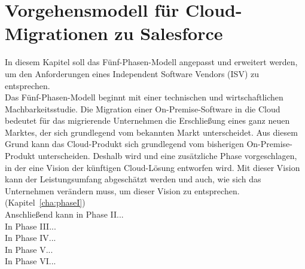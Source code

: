 \section{Vorgehensmodell für Cloud-Migrationen zu Salesforce}
\label{cha:entwickelung_vorgehensmodell}
In diesem Kapitel soll das Fünf-Phasen-Modell angepasst und erweitert werden, um den Anforderungen eines Independent Software Vendors (ISV) zu entsprechen. \\

Das Fünf-Phasen-Modell beginnt mit einer technischen und wirtschaftlichen Machbarkeitsstudie. Die Migration einer On-Premise-Software in die Cloud bedeutet für das migrierende Unternehmen die Erschließung eines ganz neuen Marktes, der sich grundlegend vom bekannten Markt unterscheidet. Aus diesem Grund kann das Cloud-Produkt sich grundlegend vom bisherigen On-Premise-Produkt unterscheiden. Deshalb wird  und  eine zusätzliche Phase vorgeschlagen, in der eine Vision der künftigen Cloud-Lösung entworfen wird. Mit dieser Vision kann der Leistungsumfang abgeschätzt werden und auch, wie sich das Unternehmen verändern muss, um dieser Vision zu entsprechen. (Kapitel~\ref{cha:phaseI})\\

Anschließend kann in Phase II... \\

In Phase III... \\

In Phase IV... \\

In Phase V... \\

In Phase VI... \\

